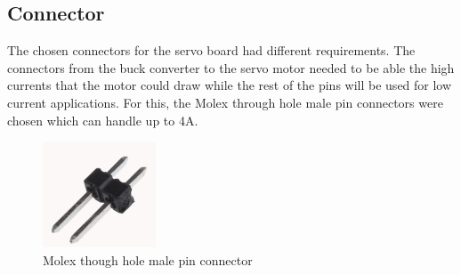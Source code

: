 \subsection{Connector}
\vspace{-5mm}
The chosen connectors for the servo board had different requirements. The connectors from the buck converter to the servo motor needed to be able the high currents that the motor could draw while the rest of the pins will be used for low current applications. For this, the Molex through hole male pin connectors were chosen which can handle up to 4A.
\vspace{-5mm}
\begin{figure}[H]
\centering
\includegraphics[width=0.3\textwidth]{molex.jpg}
\caption{Molex though hole male pin connector\cite{molex}}
\label{fig:model}
\end{figure} 
\vspace{-5mm}


\newpage
